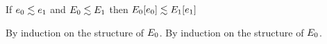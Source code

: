 \begin{lemma}\label{HA-hole-subst}
  If\/ $e_0 \lesssim e_1$
  and\/ $E_0 \lesssim E_1$
  then\/ $E_0[e_0] \lesssim E_1[e_1]$
\end{lemma}{
  \newcommand{\shortpf}{By induction on the structure of $\ctx_0$.}
\begin{lamportproof*}
  \shortpf
\mainproof
  \shortpf
\end{lamportproof*}}

